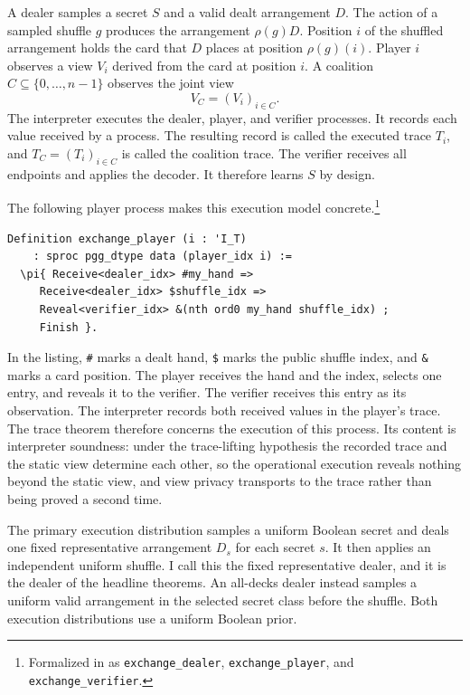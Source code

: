 \documentclass[runningheads]{llncs}
\newcommand{\coqin}[1]{\texttt{#1}}
\begin{document}
A dealer samples a secret $S$ and a valid dealt arrangement $D$. The action
of a sampled shuffle $g$ produces the arrangement $\rho(g)D$. Position $i$
of the shuffled arrangement holds the card that $D$ places at position
$\rho(g)(i)$. Player $i$
observes a view $V_i$ derived from the card at position $i$. A coalition
$C\subseteq\{0,\ldots,n-1\}$ observes the joint view
\begin{equation}
  V_C=(V_i)_{i\in C}.
  \label{eq:coalition-view}
\end{equation}
The interpreter executes the dealer, player, and verifier processes. It
records each value received by a process. The resulting record is called the
executed trace $T_i$, and $T_C=(T_i)_{i\in C}$ is called the coalition
trace. The
verifier receives all endpoints and applies the decoder. It therefore learns
$S$ by design.

The following player process makes this execution model
concrete.\footnote{Formalized in
 as
\coqin{exchange\_dealer}, \coqin{exchange\_player}, and
\coqin{exchange\_verifier}.}

\begin{lstlisting}
Definition exchange_player (i : 'I_T)
    : sproc pgg_dtype data (player_idx i) :=
  \pi{ Receive<dealer_idx> #my_hand =>
     Receive<dealer_idx> $shuffle_idx =>
     Reveal<verifier_idx> &(nth ord0 my_hand shuffle_idx) ;
     Finish }.
\end{lstlisting}

In the listing, \coqin{\#} marks a dealt hand, \coqin{\$} marks the
public shuffle index, and \coqin{\&} marks a card position. The player
receives the hand and the index, selects one entry, and reveals it to the
verifier. The verifier receives this entry as its observation. The interpreter
records both received values in the player's trace.
The trace theorem therefore concerns the execution of this process. Its
content is interpreter soundness: under the trace-lifting hypothesis the
recorded trace and the static view determine each other, so the operational
execution reveals nothing beyond the static view, and view privacy
transports to the trace rather than being proved a second time.

The primary execution distribution samples a uniform Boolean secret and
deals one fixed representative arrangement $D_s$ for each secret $s$. It
then applies an independent uniform shuffle. I call this the fixed
representative dealer, and it is the dealer of the headline theorems. An
all-decks dealer instead
samples a uniform valid arrangement in the selected secret class before the
shuffle. Both execution distributions use a uniform Boolean prior.
\end{document}
